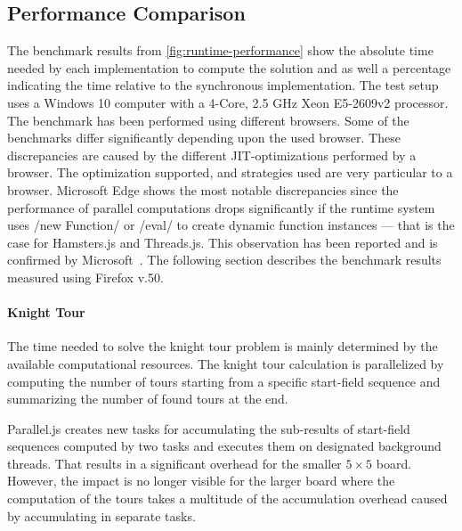 \subsection{Performance Comparison}
The benchmark results from \cref{fig:runtime-performance} show the absolute time needed by each implementation to compute the solution and as well a percentage indicating the time relative to the synchronous implementation. The test setup uses a Windows 10 computer with a 4-Core, 2.5 GHz Xeon E5-2609v2 processor. The benchmark has been performed using different browsers. Some of the benchmarks differ significantly depending upon the used browser. These discrepancies are caused by the different JIT-optimizations performed by a browser. The optimization supported, and strategies used are very particular to a browser. Microsoft Edge shows the most notable discrepancies since the performance of parallel computations drops significantly if the runtime system uses \javascriptinline/new Function/ or \javascriptinline/eval/ to create dynamic function instances --- that is the case for Hamsters.js and Threads.js. This observation has been reported and is confirmed by Microsoft~\cite{newFunctionWebWorkerEdge}. The following section describes the benchmark results measured using Firefox v.50. 

\begin{figure*}
		
	\caption{Runtime Performance of Parallelization Problems Relative to Synchronous Execution}
	\label{fig:runtime-performance}
\end{figure*}


\paragraph{Knight Tour} The time needed to solve the knight tour problem is mainly determined by the available computational resources. The knight tour calculation is parallelized by computing the number of tours starting from a specific start-field sequence and summarizing the  number of found tours at the end. 

Parallel.js creates new tasks for accumulating the sub-results of start-field sequences computed by two tasks and executes them on designated background threads. That results in a significant overhead for the smaller $5\times5$ board. However, the impact is no longer visible for the larger board where the computation of the tours takes a multitude of the accumulation overhead caused by accumulating in separate tasks.

